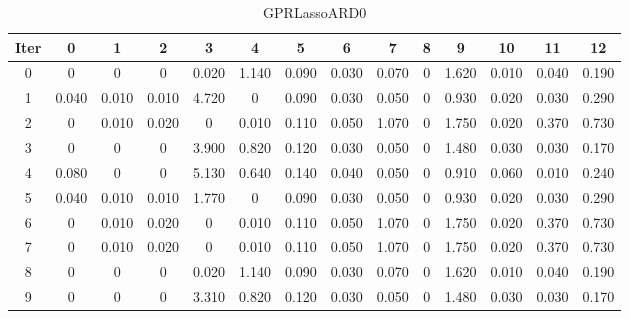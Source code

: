 \begin{table}
	\begin{center}
		\begin{tabular}{|c|c|c|c|c|c|c|c|c|c|c|c|c|c|}
			\hline
			Iter & 0 & 1 & 2 & 3 & 4 & 5 & 6 & 7 & 8 & 9 & 10 & 11 & 12 \\
			\hline
			0 & 0 & 0 & 0 & 0.020 & 1.140 & 0.090 & 0.030 & 0.070 & 0 & 1.620 & 0.010 & 0.040 & 0.190 \\
			\hline
			1 & 0.040 & 0.010 & 0.010 & 4.720 & 0 & 0.090 & 0.030 & 0.050 & 0 & 0.930 & 0.020 & 0.030 & 0.290 \\
			\hline
			2 & 0 & 0.010 & 0.020 & 0 & 0.010 & 0.110 & 0.050 & 1.070 & 0 & 1.750 & 0.020 & 0.370 & 0.730 \\
			\hline
			3 & 0 & 0 & 0 & 3.900 & 0.820 & 0.120 & 0.030 & 0.050 & 0 & 1.480 & 0.030 & 0.030 & 0.170 \\
			\hline
			4 & 0.080 & 0 & 0 & 5.130 & 0.640 & 0.140 & 0.040 & 0.050 & 0 & 0.910 & 0.060 & 0.010 & 0.240 \\
			\hline
			5 & 0.040 & 0.010 & 0.010 & 1.770 & 0 & 0.090 & 0.030 & 0.050 & 0 & 0.930 & 0.020 & 0.030 & 0.290 \\
			\hline
			6 & 0 & 0.010 & 0.020 & 0 & 0.010 & 0.110 & 0.050 & 1.070 & 0 & 1.750 & 0.020 & 0.370 & 0.730 \\
			\hline
			7 & 0 & 0.010 & 0.020 & 0 & 0.010 & 0.110 & 0.050 & 1.070 & 0 & 1.750 & 0.020 & 0.370 & 0.730 \\
			\hline
			8 & 0 & 0 & 0 & 0.020 & 1.140 & 0.090 & 0.030 & 0.070 & 0 & 1.620 & 0.010 & 0.040 & 0.190 \\
			\hline
			9 & 0 & 0 & 0 & 3.310 & 0.820 & 0.120 & 0.030 & 0.050 & 0 & 1.480 & 0.030 & 0.030 & 0.170 \\
			\hline
		\end{tabular}
	\end{center}
	\caption{GPRLassoARD0}
\end{table}